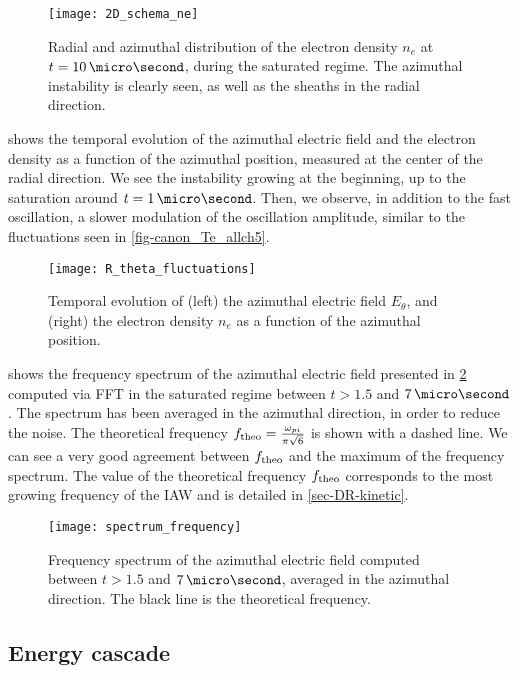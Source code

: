   \begin{figure}[hbtp]
    \centering
    \texttt{[image: 2D\_schema\_ne]}
    \caption{Radial and azimuthal distribution of the electron density $n_e$ at $t=10\,\micro\second$, during the saturated regime. The azimuthal instability is clearly seen, as well as the sheaths in the radial direction. }
    \label{fig-2D_ne}
  \end{figure}
  
   shows the temporal evolution of the azimuthal electric field and the electron density as a function of the azimuthal position, measured at the center of the radial direction.
  We see the instability growing at the beginning, up to the saturation around $t=1\,\micro\second$.
  Then, we observe, in addition to the fast oscillation, a slower modulation of the oscillation amplitude, similar to the fluctuations seen in \cref{fig-canon_Te_allch5}.
  \begin{figure}[!hbt]
    \centering
    \texttt{[image: R\_theta\_fluctuations]}
    \caption{Temporal evolution of (left) the azimuthal electric field $E_{\theta}$, and (right) the electron density $n_e$ as a function of the azimuthal position.}
    \label{fig-2DcutEx}
  \end{figure}

   shows the frequency spectrum of the azimuthal electric field presented in \cref{fig-2DcutEx} computed via \ac{FFT} in the saturated regime between $t > 1.5$ and $7\,\micro\second$.
  The spectrum has been averaged in the azimuthal direction, in order to reduce the noise.
  The theoretical frequency $f_{\rm theo} = \frac{\omega_{pi}}{\pi \sqrt{6} }$ \citep{croes2018} is shown with a dashed line. 
  We can see a very good agreement between $f_{\rm theo}$ and the maximum of the frequency spectrum.
  The value of the theoretical frequency $f_{\rm theo}$ corresponds to the most growing frequency of the \ac{IAW} and is detailed in \cref{sec-DR-kinetic}.
  \begin{figure}[!hbt]
    \centering
    \texttt{[image: spectrum\_frequency]}
    \caption{Frequency spectrum of the azimuthal electric field computed between $t > 1.5$ and $7\,\micro\second$, averaged in the azimuthal direction. The black line is the theoretical frequency.}
    \label{fig-FFT_ex}
  \end{figure}
  
  \subsection{Energy cascade} \label{subsec-turbul}
  
